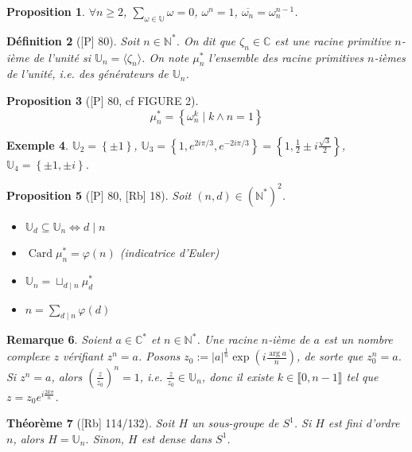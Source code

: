 \documentclass[10pt, a4paper, parskip=full, twoside, twocolumn]{report}
\newtheorem{definition}{Définition}
\newtheorem{theorem}[definition]{Théorème}
\newtheorem{proposition}[definition]{Proposition}
\newtheorem{example}[definition]{Exemple}
\newtheorem{remark}[definition]{Remarque}
\newcommand{\IN}{\mathbb{N}}
\newcommand{\IU}{\mathbb{U}}
\newcommand{\IC}{\mathbb{C}}
\DeclareMathOperator{\card}{Card}
\begin{document}
\begin{proposition}
	$\forall n\geq 2$, $\sum_{\omega\in\IU} \omega = 0$, $\omega^n = 1$, $\overline{\omega_n} = \omega_n^{n-1}$.
\end{proposition}

\begin{definition}[\textnormal{[P] 80}]
	Soit $n\in\IN^*$. On dit que $\zeta_n\in\IC$ est une \emph{racine primitive} $n$-ième de 
	l'unité si $\IU_n = \langle\zeta_n\rangle$. On note $\mu_n^*$ l'ensemble des racine primitives $n$-ièmes de l'unité, \emph{i.e.} des générateurs de $\IU_n$.
\end{definition}

\begin{proposition}[\textnormal{[P] 80}, cf FIGURE 2]
	$$\mu_n^* = \left\{\omega_n^k \mid k\wedge n = 1\right\}$$
\end{proposition}

\begin{example}
	$\IU_2 = \left\{\pm 1\right\}$, $\IU_3 = \left\{1,e^{2i\pi / 3},e^{-2i\pi/3}\right\} = \left\{1, \frac{1}{2} \pm i\frac{\sqrt{3}}{2}\right\}$, $\IU_4 = \left\{\pm 1, \pm i\right\}$.
\end{example}

\begin{proposition}[\textnormal{[P] 80, [Rb] 18}]
	Soit $(n,d)\in\left(\IN^*\right)^2$.
	\begin{itemize}
		\item[$\vartriangleright$] $\IU_d \subseteq \IU_n \iff d\mid n$
		\item[$\vartriangleright$] $\card \mu_n^* = \varphi(n)$ (indicatrice d'Euler)
		\item[$\vartriangleright$] $\IU_n = \sqcup_{d\mid n} \mu_d^*$
		\item[$\vartriangleright$] $n = \sum_{d\mid n} \varphi(d)$
	\end{itemize}
\end{proposition}

\begin{remark}
	Soient $a\in\IC^*$ et $n\in\IN^*$. Une racine $n$-ième de $a$ est un 
	nombre complexe $z$ vérifiant $z^n = a$. Posons $z_0 := |a|^{\frac{1}{n}}\exp(i\frac{\arg a}{n})$, de sorte que $z_0^n = a$.
	Si $z^n = a$, alors $\left(\frac{z}{z_0}\right)^n = 1$, \emph{i.e.} $\frac{z}{z_0}\in\IU_n$, donc 
	il existe $k\in\llbracket 0, n-1\rrbracket$ tel que $z = z_0e^{i\frac{2k\pi}{n}}$.
\end{remark}

\begin{theorem}[\textnormal{[Rb] 114/132}]
	Soit $H$ un sous-groupe de $S^1$. Si $H$ est fini d'ordre $n$, alors $H = \IU_n$. Sinon, $H$ est dense dans $S^1$.
\end{theorem}
\end{document}
